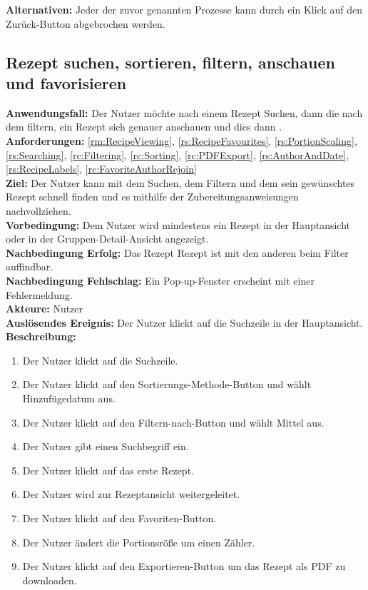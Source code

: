 \documentclass[parskip=full]{scrartcl}
\begin{document}
\textbf{Alternativen:} Jeder der zuvor genannten Prozesse kann durch ein Klick auf den Zurück-Button abgebrochen werden.
\newpage


\subsection{Rezept suchen, sortieren, filtern, anschauen und favorisieren}
\textbf{Anwendungsfall:} Der Nutzer möchte nach einem Rezept Suchen, dann die  nach dem  filtern, ein Rezept sich genauer anschauen und dies dann .\\
\textbf{Anforderungen:} \ref{rm:RecipeViewing}, \ref{rs:RecipeFavourites}, \ref{rs:PortionScaling}, \ref{rs:Searching}, \ref{rc:Filtering}, \ref{rc:Sorting}, \ref{rc:PDFExport}, \ref{rs:AuthorAndDate}, \ref{rs:RecipeLabels}, \ref{rc:FavoriteAuthorRejoin}\\
\textbf{Ziel:} Der Nutzer kann mit dem Suchen, dem Filtern und dem  sein gewünschtes Rezept schnell finden und es mithilfe der Zubereitungsanweisungen nachvollziehen.\\
\textbf{Vorbedingung:} Dem Nutzer wird mindestens ein Rezept in der Hauptansicht oder in der Gruppen-Detail-Ansicht angezeigt.\\
\textbf{Nachbedingung Erfolg:} Das Rezept  Rezept ist mit den anderen   beim Filter   auffindbar.\\
\textbf{Nachbedingung Fehlschlag:} Ein Pop-up-Fenster erscheint mit einer Fehlermeldung.\\
\textbf{Akteure:} Nutzer\\
\textbf{Auslösendes Ereignis:} Der Nutzer klickt auf die Suchzeile in der Hauptansicht.\\
\textbf{Beschreibung:}
\begin{enumerate}
    \item Der Nutzer klickt auf die Suchzeile.
    \item Der Nutzer klickt auf den Sortierungs-Methode-Button und wählt Hinzufügedatum aus.
    \item Der Nutzer klickt auf den Filtern-nach-Button und wählt  Mittel aus.
    \item Der Nutzer gibt einen Suchbegriff ein.
    \item Der Nutzer klickt auf das erste Rezept.
    \item Der Nutzer wird zur Rezeptansicht weitergeleitet.
    \item Der Nutzer klickt auf den Favoriten-Button.
    \item Der Nutzer ändert die Portionsröße um einen Zähler.
    \item Der Nutzer klickt auf den Exportieren-Button um das Rezept als PDF zu downloaden.
\end{enumerate}
\end{document}
